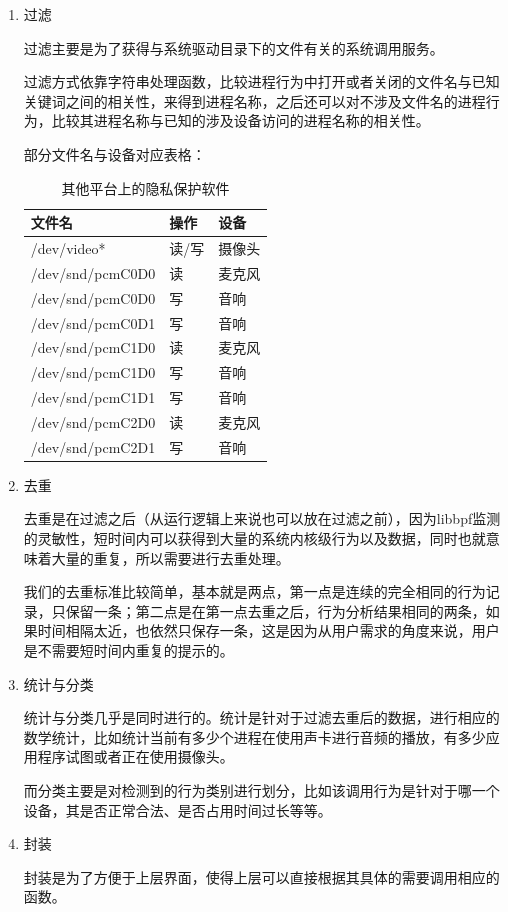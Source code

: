 \documentclass[12pt,a4paper]{ctexart}
\begin{document}
\begin{enumerate}
  \item 过滤

过滤主要是为了获得与系统驱动目录下的文件有关的系统调用服务。


过滤方式依靠字符串处理函数，比较进程行为中打开或者关闭的文件名与已知关键词之间的相关性，来得到进程名称，之后还可以对不涉及文件名的进程行为，比较其进程名称与已知的涉及设备访问的进程名称的相关性。

部分文件名与设备对应表格：


\begin{table}[htb]
\centering
\begin{tabular}{|p{4cm}|p{2cm}|p{3cm}|}
  \hline
  \rowcolor{blue!50} 文件名&操作&设备\\
  \hline
   /dev/video*&读/写&摄像头\\
  \hline
  /dev/snd/pcmC0D0&读&麦克风\\
  \hline
  /dev/snd/pcmC0D0&写&音响\\
  \hline
  /dev/snd/pcmC0D1&写&音响\\
  \hline
  /dev/snd/pcmC1D0&读&麦克风\\
  \hline
  /dev/snd/pcmC1D0&写&音响\\
  \hline
  /dev/snd/pcmC1D1&写&音响\\
  \hline
  /dev/snd/pcmC2D0&读&麦克风\\
  \hline
  /dev/snd/pcmC2D1&写&音响\\
  \hline
\end{tabular}
\caption{其他平台上的隐私保护软件}
\end{table}
\restoregeometry
  \item 去重


去重是在过滤之后（从运行逻辑上来说也可以放在过滤之前），因为libbpf监测的灵敏性，短时间内可以获得到大量的系统内核级行为以及数据，同时也就意味着大量的重复，所以需要进行去重处理。


我们的去重标准比较简单，基本就是两点，第一点是连续的完全相同的行为记录，只保留一条；第二点是在第一点去重之后，行为分析结果相同的两条，如果时间相隔太近，也依然只保存一条，这是因为从用户需求的角度来说，用户是不需要短时间内重复的提示的。

  \item 统计与分类

统计与分类几乎是同时进行的。统计是针对于过滤去重后的数据，进行相应的数学统计，比如统计当前有多少个进程在使用声卡进行音频的播放，有多少应用程序试图或者正在使用摄像头。


而分类主要是对检测到的行为类别进行划分，比如该调用行为是针对于哪一个设备，其是否正常合法、是否占用时间过长等等。

  \item 封装

封装是为了方便于上层界面，使得上层可以直接根据其具体的需要调用相应的函数。

\end{enumerate}
\end{document}
